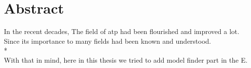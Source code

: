 \chapter*{Abstract}
\label{chap:abstract}

In the recent decades, The field of \ac{atp} had been flourished and improved a lot.
Since its importance to many fields had been known and understood.
\\*
\\
With that in mind, here in this thesis we tried to add model finder part in the E.  
